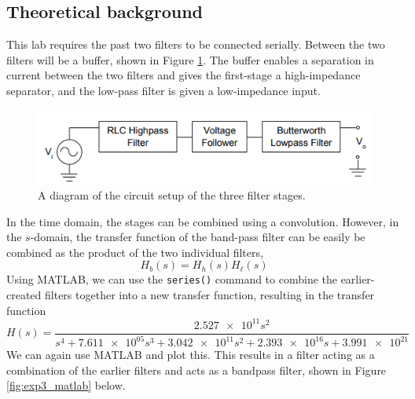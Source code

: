 \documentclass{report}
\begin{document}
\subsection{Theoretical background}
This lab requires the past two filters to be connected serially. Between the two filters will be a buffer, shown in Figure \ref{fig:exp3ckt}. The buffer enables a separation in current between the two filters and gives the first-stage a high-impedance separator, and the low-pass filter is given a low-impedance input.
\begin{figure}[H]
	\centering
	\includegraphics[width=0.5\linewidth]{exp3ckt}
	\caption{A diagram of the circuit setup of the three filter stages.}
	\label{fig:exp3ckt}
\end{figure}
\noindent In the time domain, the stages can be combined using a convolution. However, in the $s$-domain, the transfer function of the band-pass filter can be easily be combined as the product of the two individual filters, \begin{equation}
	H_b(s) = H_h(s) H_\ell(s)
\end{equation}
Using MATLAB, we can use the \texttt{series()} command to combine the earlier-created filters together into a new transfer function, resulting in the transfer function \begin{equation}
H(s) = \frac{ \num{2.527e11} s^2 }
	{s^4 + \num{7.611e05} s^3 + \num{3.042e11}s^2 + \num{2.393e16} s + \num{3.991e21}}
\end{equation}
We can again use MATLAB and plot this. This results in a filter acting as a combination of the earlier filters and acts as a bandpass filter, shown in Figure \ref{fig:exp3_matlab} below.
\end{document}
